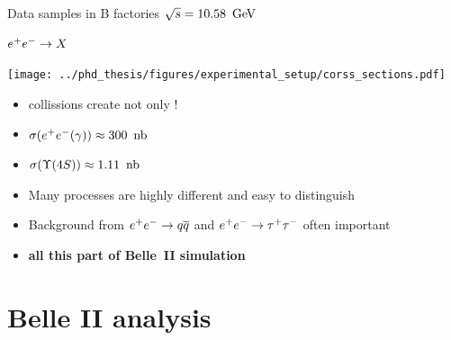 \documentclass[xcolor=dvipsnames]{beamer}
\begin{document}
   \begin{frame}{Data samples in B factories}
      \scriptsize\centering
      \textbf{$\sqrt{s} = 10.58~\mathrm{\,Ge\kern -0.1em V}$}
      
      $e^+e^-\rightarrow X$

      \texttt{[image: ../phd\_thesis/figures/experimental\_setup/corss\_sections.pdf]}
      \begin{itemize}
         \item \epem collissions create not only \FourS!
         \item[] $\sigma({e^+e^-(\gamma)}) \approx 300~{\rm \,nb}$
         \item[] $\sigma({\FourS}) \approx 1.11~\nb$
         \item Many processes are highly different and easy to distinguish
         \item Background from $e^+e^-\rightarrow q\overline q$ and $e^+e^-\rightarrow\tau^+\tau^-$ often important
         \item[\ra] \textbf{all this part of Belle~II simulation}
      \end{itemize}
   \end{frame}

   \section{Belle II analysis}
\end{document}
